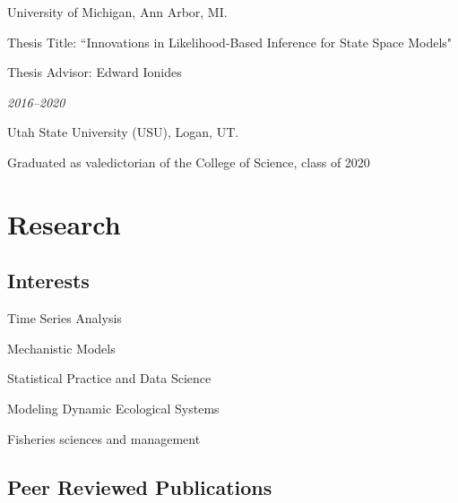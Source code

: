 \documentclass[11pt]{article}
\newenvironment {interests}
                {
                 \begin{list}{}
                 {\setlength{\labelwidth}{0mm}
                  \setlength{\leftmargin}{8mm}
                  \setlength{\itemindent}{-3mm}
                  \setlength{\labelsep}{0mm}
                  \setlength{\parsep}{0.1 ex}
                  \setlength{\itemsep}{1pt}
      \setlength{\topsep}{0.15cm}}} %
   {\end{list}}
\begin{document}
University of Michigan, Ann Arbor, MI.

Thesis Title: ``Innovations in Likelihood-Based Inference for State Space Models"

Thesis Advisor: Edward Ionides

\vspace{2mm}

 \hfill  {\textit{2016--2020}}

Utah State University (USU), Logan, UT.

Graduated as valedictorian of the College of Science, class of 2020

\section*{Research}
\subsection*{Interests}
\begin{interests}
    \item Time Series Analysis
    \item Mechanistic Models
    \item Statistical Practice and Data Science
    \item Modeling Dynamic Ecological Systems
    \item Fisheries sciences and management

\end{interests}

\subsection*{Peer Reviewed Publications}
\end{document}
